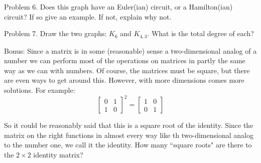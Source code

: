 \documentclass[16 pt]{amsart}
\theoremstyle{definition}
\theoremstyle{remark}
\numberwithin{equation}{subsection}
\begin{document}
\newpage

Problem 6. Does this graph have an Euler(ian) circuit, or a Hamilton(ian) circuit? If so give an example.  If not, explain why not.

\vspace{.25in}
\begin{center}

\end{center}

\newpage

Problem 7. Draw the two graphs: $K_6$ and $K_{4,3}$.  What is the total degree of each?

\newpage

Bonus: Since a matrix is in some (reasonable) sense a two-dimensional analog of a number we can perform most of the operations on matrices in partly the same way as we can with numbers.  Of course, the matrices must be square, but there are even ways to get around this.  However, with more dimensions comes more solutions.  For example:
\[
\begin{bmatrix}
0&1\\1&0
\end{bmatrix}^2 = \begin{bmatrix}
1 & 0\\ 0 & 1
\end{bmatrix}
\]

So it could be reasonably said that this is a square root of the identity.  Since the matrix on the right functions in almost every way like th two-dimensional analog to the number one, we call it the identity.  How many ``square roots" are there to the $2\times 2$ identity matrix?
\end{document}
